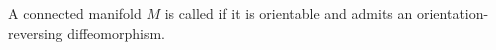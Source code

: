 A connected manifold $M$ is called  if it is orientable and admits an orientation-reversing diffeomorphism.
